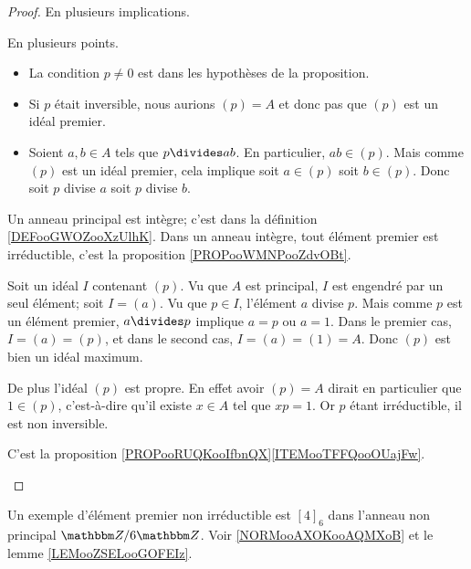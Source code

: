 \begin{proof}
    En plusieurs implications.
    \begin{subproof}
        \item[\ref{ITEMooBTEAooWlFUTX} implique \ref{ITEMooKQRMooBNPDMX}]
            En plusieurs points.
            \begin{itemize}
                \item La condition \( p\neq 0\) est dans les hypothèses de la proposition.
                \item Si \( p\) était inversible, nous aurions \( (p)=A\) et donc pas que \( (p)\) est un idéal premier.
                \item Soient \( a,b\in A\) tels que \( p\divides ab\). En particulier, \( ab \in (p)\). Mais comme \( (p)\) est un idéal premier, cela implique soit \( a\in (p)\) soit \( b\in (p)\). Donc soit \( p\) divise \( a\) soit \( p\) divise \( b\).
            \end{itemize}
        \item[\ref{ITEMooKQRMooBNPDMX} implique \ref{ITEMooZYYJooCWiBhL}]
            Un anneau principal est intègre; c'est dans la définition \ref{DEFooGWOZooXzUlhK}. Dans un anneau intègre, tout élément premier est irréductible, c'est la proposition \ref{PROPooWMNPooZdvOBt}.
        \item[\ref{ITEMooZYYJooCWiBhL} implique \ref{ITEMooHPAIooYoQzqD}]
            Soit un idéal \( I\) contenant \( (p)\). Vu que \( A\) est principal, \( I\) est engendré par un seul élément; soit \( I=(a)\). Vu que \( p\in I\), l'élément \( a\) divise \( p\). Mais comme \( p\) est un élément premier, \( a\divides p\) implique \( a=p\) ou \( a=1\). Dans le premier cas, \( I=(a)=(p)\), et dans le second cas, \( I=(a)=(1)=A\). Donc \( (p)\) est bien un idéal maximum.

            De plus l'idéal \( (p)\) est propre. En effet avoir \( (p)=A\) dirait en particulier que \( 1\in (p)\), c'est-à-dire qu'il existe \( x\in A\) tel que \( xp=1\). Or \( p\) étant irréductible, il est non inversible.
        \item[\ref{ITEMooHPAIooYoQzqD} implique \ref{ITEMooBTEAooWlFUTX}]
            C'est la proposition \ref{PROPooRUQKooIfbnQX}\ref{ITEMooTFFQooOUajFw}.
    \end{subproof}
\end{proof}

Un exemple d'élément premier non irréductible est \( [4]_6\) dans l'anneau non principal \( \eZ/6\eZ\). Voir \ref{NORMooAXOKooAQMXoB} et le lemme \ref{LEMooZSELooGOFEIz}.

